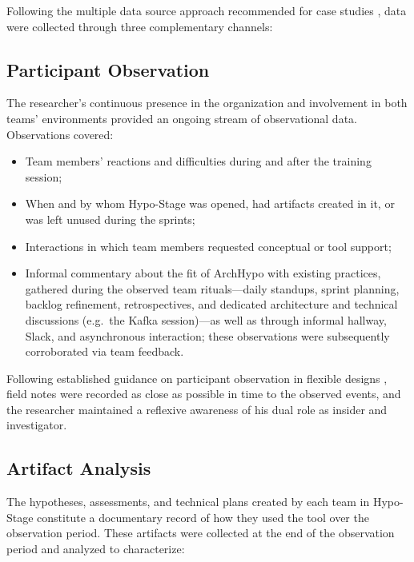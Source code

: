 Following the multiple data source approach recommended for case studies \citep{robson2016,yin2009}, data were collected through three complementary channels:

\subsection{Participant Observation}
\label{subsec:participant-observation}

The researcher's continuous presence in the organization and involvement in both
teams' environments provided an ongoing stream of observational data. Observations
covered: 

\begin{itemize}
  \item[(i)] Team members' reactions and difficulties during and after the training
  session;
  \item[(ii)] When and by whom Hypo-Stage was opened, had artifacts created in it, or was left unused during the sprints;
  \item[(iii)] Interactions in which team members requested conceptual or tool support;
  \item[(iv)] Informal commentary about the fit of ArchHypo with existing practices, gathered during the observed team rituals---daily standups, sprint planning, backlog refinement, retrospectives, and dedicated architecture and technical discussions (e.g.\ the Kafka session)---as well as through informal hallway, Slack, and asynchronous interaction; these observations were subsequently corroborated via team feedback.
\end{itemize}

Following established guidance on participant observation in flexible designs \citep{robson2016}, field notes were recorded as close as possible in time to the observed events, and the researcher maintained a reflexive awareness of his dual role as insider and investigator.

\subsection{Artifact Analysis}
\label{subsec:artifact-analysis}

The hypotheses, assessments, and technical plans created by each team in Hypo-Stage
constitute a documentary record of how they used the tool over the observation period.
These artifacts were collected at the end of the observation period and analyzed to
characterize:

